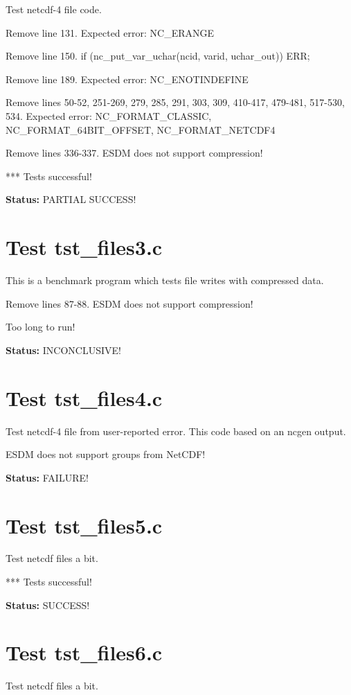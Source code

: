 Test netcdf-4 file code.

Remove line 131. Expected error: NC\_ERANGE

Remove line 150. if (nc\_put\_var\_uchar(ncid, varid, uchar\_out)) ERR;

Remove line 189. Expected error: NC\_ENOTINDEFINE

Remove lines 50-52, 251-269, 279, 285, 291, 303, 309, 410-417, 479-481, 517-530, 534. Expected error: NC\_FORMAT\_CLASSIC, NC\_FORMAT\_64BIT\_OFFSET, NC\_FORMAT\_NETCDF4

Remove lines 336-337. ESDM does not support compression!

*** Tests successful!

{\bf \large Status: } PARTIAL SUCCESS!

\section{Test tst\_files3.c}

This is a benchmark program which tests file writes with compressed data.

Remove lines 87-88. ESDM does not support compression!

Too long to run!

{\bf \large Status: } INCONCLUSIVE!

\section{Test tst\_files4.c}

Test netcdf-4 file from user-reported error. This code based on an ncgen output.

ESDM does not support groups from NetCDF!

{\bf \large Status: } FAILURE!

\section{Test tst\_files5.c}

Test netcdf files a bit.

*** Tests successful!

{\bf \large Status: } SUCCESS!

\section{Test tst\_files6.c}

Test netcdf files a bit.

